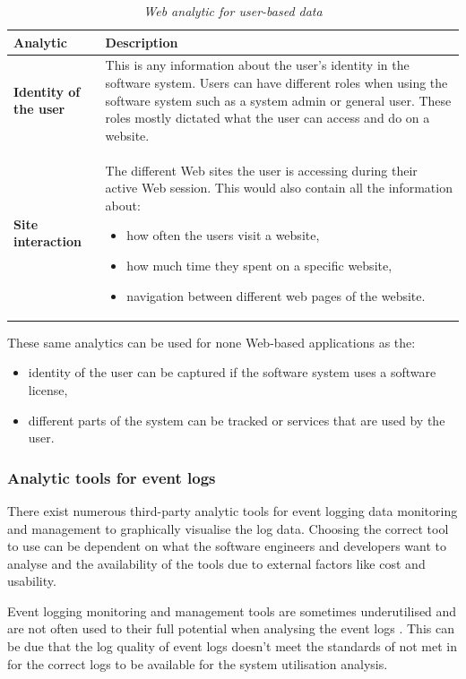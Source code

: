 \begin{table}[!htb]
	\centering
	\caption[Web analytic for user-based data]
	{\textit{Web analytic for user-based data}}
	\label{tbl:ch1_webAnalytics}
	\begin{tabularx}{\textwidth}{|l|X|}
		\hline \textbf{Analytic}  & \textbf{Description} \\
		\hline \textbf{Identity of the user} & This is any information about the user's identity in the software system. Users can have different roles when using the software system such as a system admin or general user. These roles mostly dictated what the user can access and do on a website. \\
		\hline \textbf{Site interaction} & The different Web sites the user is accessing during their active Web session. This would also contain all the information about: 
		\begin{itemize}
			\item how often the users visit a website,
			\item how much time they spent on a specific website,
			\item navigation between different web pages of the website.
		\end{itemize}
		\\
		\hline
	\end{tabularx}
\end{table}

These same analytics can be used for none Web-based applications as the: 
\begin{itemize}
	\item identity of the user can be captured if the software system uses a software license,
	\item different parts of the system can be tracked or services that are used by the user.
\end{itemize} 

\subsubsection{Analytic tools for event logs}
There exist numerous third-party analytic tools for event logging data monitoring and management to graphically visualise the log data. Choosing the correct tool to use can be dependent on what the software engineers and developers want to analyse and the availability of the tools due to external factors like cost and usability. \par Event logging monitoring and management tools are sometimes underutilised and are not often used to their full potential when analysing the event logs \cite{Fedaghi2010}. This can be due that the log quality of event logs doesn't meet the standards of  not met in  for the correct logs to be available for the system utilisation analysis. 

